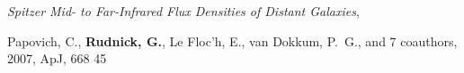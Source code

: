 \documentclass[11pt]{article}
\begin{document}
\hangindent=1.5cm  
{\it Spitzer Mid- to Far-Infrared Flux Densities of Distant
  Galaxies}, {{Papovich}, C., {\bf {Rudnick}, G.}, {Le Floc'h}, E.,
  {van Dokkum}, P.~G., and 7 coauthors,
  2007, ApJ, 668 45








}
\end{document}
